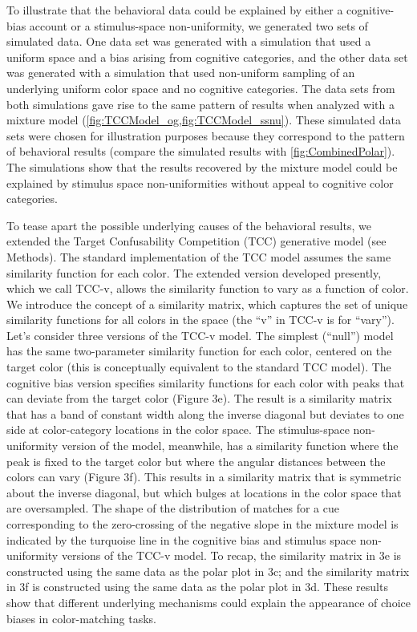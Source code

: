 To illustrate that the behavioral data could be explained by either a cognitive-bias account or a stimulus-space non-uniformity, we generated two sets of simulated data. 
One data set was generated with a simulation that used a uniform space and a bias arising from cognitive categories, and the other data set was generated with a simulation that used non-uniform sampling of an underlying uniform color space and no cognitive categories.
The data sets from both simulations gave rise to the same pattern of results when analyzed with a mixture model (\autoref{fig:TCCModel_og,fig:TCCModel_ssnu}).
These simulated data sets were chosen for illustration purposes because they correspond to the pattern of behavioral results (compare the simulated results with \autoref{fig:CombinedPolar}). 
The simulations show that the results recovered by the mixture model could be explained by stimulus space non-uniformities without appeal to cognitive color categories. 

To tease apart the possible underlying causes of the behavioral results, we extended the Target Confusability Competition (TCC) generative model \citep{schurgin_psychophysical_2020} (see Methods). %
The standard implementation of the TCC model assumes the same similarity function for each color. 
The extended version developed presently, which we call TCC-v, allows the similarity function to vary as a function of color.
We introduce the concept of a similarity matrix, which captures the set of unique similarity functions for all colors in the space (the ``v'' in TCC-v is for ``vary'').
Let's consider three versions of the TCC-v model.
The simplest (“null”) model has the same two-parameter similarity function for each color, centered on the target color (this is conceptually equivalent to the standard TCC model).  
The cognitive bias version specifies similarity functions for each color with peaks that can deviate from the target color (Figure 3e). 
The result is a similarity matrix that has a band of constant width along the inverse diagonal but deviates to one side at color-category locations in the color space. 
The stimulus-space non-uniformity version of the model, meanwhile, has a similarity function where the peak is fixed to the target color but where the angular distances between the colors can vary (Figure 3f). 
This results in a similarity matrix that is symmetric about the inverse diagonal, but which bulges at locations in the color space that are oversampled. 
The shape of the distribution of matches for a cue corresponding to the zero-crossing of the negative slope in the mixture model is indicated by the turquoise line in the cognitive bias and stimulus space non-uniformity versions of the TCC-v model. 
To recap, the similarity matrix in 3e is constructed using the same data as the polar plot in 3c; and the similarity matrix in 3f is constructed using the same data as the polar plot in 3d. 
These results show that different underlying mechanisms could explain the appearance of choice biases in color-matching tasks.

